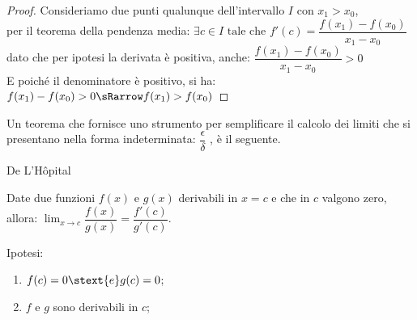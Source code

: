 \bigskip
\begin{proof}
Consideriamo due punti qualunque dell'intervallo \(I\) con \(x_1 > x_0\), 
\\[2mm]
per il teorema della pendenza media: \hspace{22mm} 
\(\exists c \in I \text { tale che } 
  f'(c) = \dfrac{f(x_1)-f(x_0)}{x_1-x_0}\) \\
dato che per ipotesi la derivata è positiva, anche: \hspace{3.5mm}
\(\dfrac{f(x_1)-f(x_0)}{x_1-x_0}>0 \)\\[3mm]
E poiché il denominatore è positivo, si ha: \hspace{14.5mm}
\(f(x_1)-f(x_0)>0 \sRarrow f(x_1)>f(x_0)\)
\end{proof}

\bigskip
Un teorema che fornisce uno strumento per semplificare il calcolo dei 
limiti che si presentano nella forma indeterminata: 
\(\dfrac{\epsilon}{\delta}\) %
, è il seguente.


\begin{newtheo}{De L'H\^opital}{}

Date due funzioni \(f(x)\) e \(g(x)\) derivabili in \(x = c\) 
e che in \(c\) valgono zero, allora: \qquad 
\(\displaystyle \lim_{x \to c} \dfrac{f(x)}{g(x)} = 
  \dfrac{f'(c)}{g'(c)}\).
% 

\end{newtheo}

\noindent Ipotesi: 
\begin{enumerate}[nosep]
 \item \(f(c) = 0 \stext{e} g(c) = 0\);
 \item \(f\) e \(g\) sono derivabili in \(c\);
\end{enumerate}

